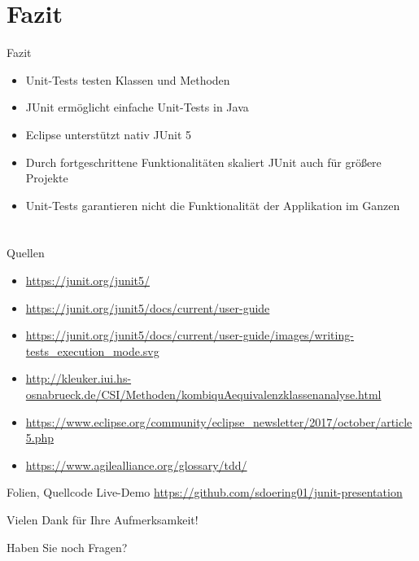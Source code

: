 \documentclass[utf8,t,aspectratio=169]{beamer}
\begin{document}
  \section{Fazit}
    \begin{frame}{Fazit}
      \begin{itemize}
        \item Unit-Tests testen Klassen und Methoden
        \item JUnit ermöglicht einfache Unit-Tests in Java
        \item Eclipse unterstützt nativ JUnit 5
        \item Durch fortgeschrittene Funktionalitäten skaliert JUnit auch für größere Projekte
        \item Unit-Tests garantieren nicht die Funktionalität der Applikation im Ganzen
      \end{itemize}
    \end{frame}

	\section*{}
    \begin{frame}{Quellen}
      \begin{itemize}
        \item \url{https://junit.org/junit5/}
        \item \url{https://junit.org/junit5/docs/current/user-guide}
        \item
          \url{https://junit.org/junit5/docs/current/user-guide/images/writing-tests_execution_mode.svg}
        \item
          \url{http://kleuker.iui.hs-osnabrueck.de/CSI/Methoden/kombiquAequivalenzklassenanalyse.html}
        \item
          \url{https://www.eclipse.org/community/eclipse_newsletter/2017/october/article5.php}
        \item \url{https://www.agilealliance.org/glossary/tdd/}
      \end{itemize}
    \end{frame}
    \begin{frame}[c]{Folien, Quellcode Live-Demo}
      \Large
      \centering
      \url{https://github.com/sdoering01/junit-presentation}
    \end{frame}
    \begin{frame}[c]
      \Huge
      \centering
      Vielen Dank für Ihre Aufmerksamkeit!

      Haben Sie noch Fragen?
    \end{frame}
\end{document}
